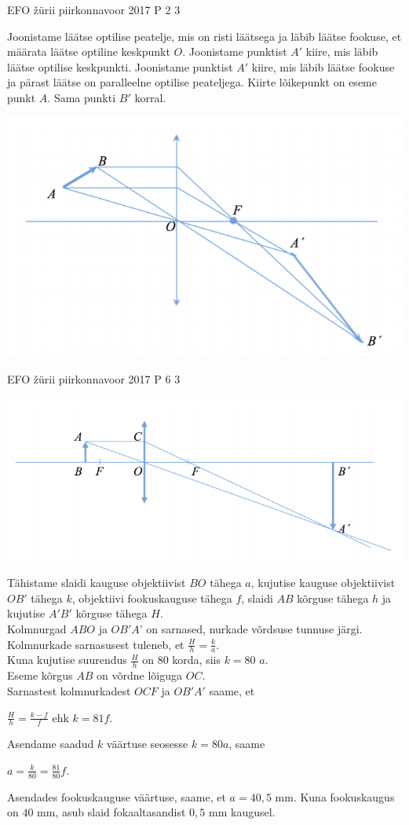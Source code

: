 \documentclass[11pt]{article}
\begin{document}
{%
{EFO žürii} %
{piirkonnavoor} %
{2017} %
{P 2} %
{3} %
{

\ifSolution
Joonistame läätse optilise peatelje, mis on risti läätsega ja läbib läätse fookuse, et määrata läätse optiline keskpunkt $O$. Joonistame punktist $A'$ kiire, mis läbib läätse optilise keskpunkti. Joonistame punktist $A'$ kiire, mis läbib läätse fookuse ja pärast läätse on paralleelne optilise peateljega. Kiirte lõikepunkt on eseme punkt $A$. Sama punkti $B'$ korral.
\begin{center}
	\includegraphics[width=0.5\linewidth]{2017-v2p-02-lah.PNG}
\end{center}
\fi
}


{EFO žürii} %
{piirkonnavoor} %
{2017} %
{P 6} %
{3} %
{

\ifSolution
\begin{center}
	\includegraphics[width=0.5\linewidth]{2017-v2p-06-lah.PNG}
\end{center}
Tähistame slaidi kauguse objektiivist $BO$ tähega $a$, kujutise kauguse objektiivist $OB'$ tähega $k$, objektiivi fookuskauguse tähega $f$, slaidi $AB$ kõrguse tähega $h$ ja kujutise $A'B'$ kõrguse tähega $H$.\\
Kolmnurgad $ABO$ ja $OB'A$’ on sarnased, nurkade võrdsuse tunnuse järgi. \\
Kolmnurkade sarnasusest tuleneb, et $\frac{H}{h} = \frac{k}{a}$. \\
Kuna kujutise suurendus $\frac{H}{h}$ on $80$ korda, siis $k = 80$ $a$. \\
Eseme kõrgus $AB$ on võrdne lõiguga $OC$. \\
Sarnastest kolmnurkadest $OCF$ ja $OB'A'$  saame, et
\begin{center}
$\frac{H}{h} = \frac{k - f}{f}$ ehk $k = 81f$. 
\end{center}
Asendame saadud $k$ väärtuse seosesse $k = 80a$, saame 
\begin{center}
$a = \frac{k}{80} = \frac{81}{80}f$. 
\end{center}
Asendades fookuskauguse väärtuse, saame, et $a = 40,5$ mm. Kuna fookuskaugus on $40$ mm, asub slaid fokaaltasandist $0,5$ mm kaugusel.
\fi
}

}
\end{document}
